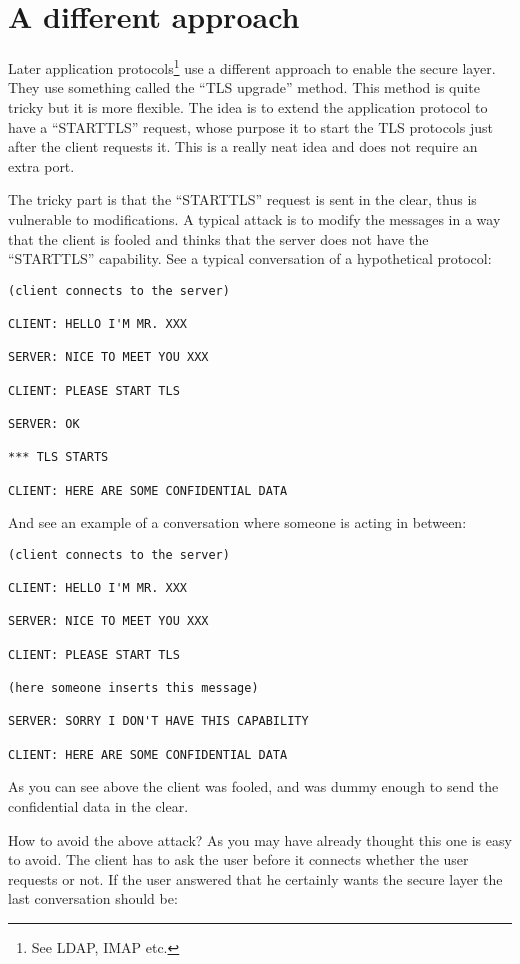 \section{A different approach}
Later application protocols\footnote{See LDAP, IMAP etc.}
use a different approach to enable the secure layer.
They use something called the ``TLS upgrade'' method. This method
is quite tricky but it is more flexible. The idea is to extend
the application protocol to have a ``STARTTLS'' request, whose purpose
it to start the TLS protocols just after the client requests it.
This is a really neat idea and does not require an extra port.
\par
The tricky part is that the ``STARTTLS'' request is sent in the clear,
thus is vulnerable to modifications. A typical attack is to modify the
messages in a way that the client is fooled and thinks that the server
does not have the ``STARTTLS'' capability. See a typical conversation
of a hypothetical protocol:
\begin{verbatim}
(client connects to the server)

CLIENT: HELLO I'M MR. XXX

SERVER: NICE TO MEET YOU XXX

CLIENT: PLEASE START TLS

SERVER: OK

*** TLS STARTS

CLIENT: HERE ARE SOME CONFIDENTIAL DATA

\end{verbatim}

And see an example of a conversation where someone is acting
in between:

\begin{verbatim}
(client connects to the server)

CLIENT: HELLO I'M MR. XXX

SERVER: NICE TO MEET YOU XXX

CLIENT: PLEASE START TLS

(here someone inserts this message)

SERVER: SORRY I DON'T HAVE THIS CAPABILITY

CLIENT: HERE ARE SOME CONFIDENTIAL DATA

\end{verbatim}

As you can see above the client was fooled, and was dummy enough
to send the confidential data in the clear.
\par
How to avoid the above attack? As you may have already thought
this one is easy to avoid. The client has to ask the user before it connects
whether the user requests \tls{} or not. If the user answered that he
certainly wants the secure layer the last conversation should be:

